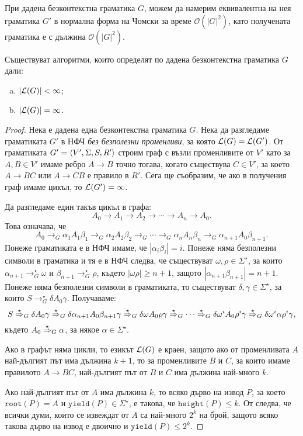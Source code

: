 \begin{theorem}
  При дадена безконтекстна граматика $G$, можем да намерим еквивалентна
  на нея граматика $G'$ в нормална форма на Чомски за време $\mathcal{O}(|G|^2)$,
  като получената граматика е с дължина $\mathcal{O}(|G|^2)$.
\end{theorem}

\begin{theorem}
  Съществуват алгоритми, които определят по дадена безконтекстна граматика $G$ дали:
  \begin{enumerate}[a)]
  \item
    $\vert{\mathcal{L}(G)}\vert < \infty$;
  \item
    $\vert{\mathcal{L}(G)}\vert = \infty$.
  \end{enumerate}
\end{theorem}
\begin{proof}
  Нека е дадена една безконтекстна граматика $G$.
  Нека да разгледаме граматиката $G'$ в НФЧ {\em без безполезни променливи}, за която $\mathcal{L}(G) = \mathcal{L}(G')$.
  От граматиката $G' = \langle{V',\Sigma,S,R'}\rangle$ строим граф с възли променливите от $V'$ като
  за $A,B \in V'$ имаме ребро $A \to B$ точно тогава, когато съществува $C \in V'$,
  за което $A \to BC$ или $A \to CB$ е правило в $R'$.
  Сега ще съобразим, че ако в получения граф имаме цикъл, то $\mathcal{L}(G') = \infty$.

  Да разгледаме един такъв цикъл в графа:
  \[A_0 \to A_1 \to A_2 \to \cdots \to A_n \to A_0.\]
  Това означава, че 
  \[A_0 \to_G \alpha_1 A_1 \beta_1 \to_G \alpha_2 A_2 \beta_2 \to_G \cdots \to_G \alpha_n A_n \beta_n \to_G \alpha_{n+1} A_0 \beta_{n+1}.\]
  Понеже граматиката е в НФЧ имаме, че $|\alpha_i\beta_i| = i$.
  Понеже няма безполезни символи в граматика и тя е в НФЧ следва, че съществуват $\omega,\rho \in \Sigma^\star$, за които $\alpha_{n+1} \to^\star_G \omega$ и $\beta_{n+1} \to^\star_G \rho$,
  където $|\omega\rho| \geq n+1$, защото $|\alpha_{n+1}\beta_{n+1}| = n+1$.
  Понеже няма безполезни символи в граматиката, то съществуват $\delta, \gamma \in \Sigma^\star$, за които
  $S \to^\star_G \delta  A_0 \gamma$. Получаваме:
  \[ S \stackrel{{\star}}{\Rightarrow}_G \delta A_0 \gamma \stackrel{{\star}}{\Rightarrow}_G \delta \alpha_{n+1} A_0 \beta_{n+1} \gamma \stackrel{{\star}}{\Rightarrow}_G \delta \omega A_0 \rho\gamma \stackrel{{\star}}{\Rightarrow}_G \cdots \stackrel{{\star}}{\Rightarrow}_G \delta \omega^i A_0 \rho^i \gamma \stackrel{{\star}}{\Rightarrow}_G \delta\omega^i\alpha\rho^i\gamma,\]
  където $A_0 \stackrel{{\star}}{\Rightarrow}_G \alpha$, за някое $\alpha \in \Sigma^\star$.

  Ако в графът няма цикли, то езикът $\mathcal{L}(G)$ е краен, защото ако от променливата $A$ най-дългият път има дължина $k+1$,
  то за променливите $B$ и $C$, за които имаме правилото $A\to BC$, най-дългият път от $B$ и $C$ има дължина най-много $k$.

  Ако най-дългият път от $A$ има дължина $k$, то всяко дърво на извод $P$, за което $\texttt{root}(P) = A$ и $\texttt{yield}(P) \in \Sigma^\star$,
  е такова, че $\texttt{height}(P) \leq k$. От  следва, че всички думи, които се извеждат от $A$ са най-много $2^{k}$ на брой,
  защото всяко такова дърво на извод е двоично и $\texttt{yield}(P) \leq 2^k$.
\end{proof}


